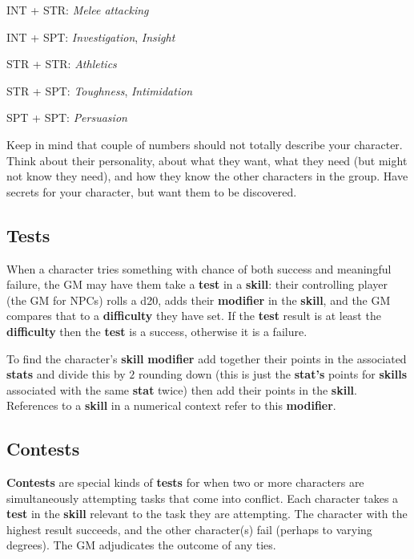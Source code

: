 \documentclass[11pt]{article}
\begin{document}
\begin{multicols}{3}
\begin{multicols}{2}
    INT + STR: ​\textit{Melee attacking}

    INT + SPT: \textit{Investigation}, \textit{Insight}

    STR + STR: \textit{​Athletics}

    STR + SPT: \textit{​Toughness}, \textit{Intimidation}

    SPT + SPT: ​\textit{Persuasion}
  \end{multicols}

  Keep in mind that couple of numbers should not totally describe your
  character. Think about their personality, about what they want, what they need
  (but might not know they need), and how they know the other characters in the
  group. Have secrets for your character, but want them to be discovered.

  \subsection*{Tests}

  When a character tries something with chance of both success and meaningful
  failure, the GM may have them take a \textbf{​test}​ in a \textbf{skill}: their
  controlling player (the GM for NPCs) rolls a d20, adds their \textbf{modifier}
  in the \textbf{skill}, and the GM compares that to a \textbf{difficulty} they
  have set. If the \textbf{test} result is at least the \textbf{difficulty} then
  the \textbf{test} is a success, otherwise it is a failure.

  To find the character's \textbf{skill} \textbf{modifier} add together their
  points in the associated \textbf{stats} and divide this by $2$ rounding down
  (this is just the \textbf{stat's} points for \textbf{skills} associated with
  the same \textbf{stat} twice) then add their points in the \textbf{skill}.
  References to a \textbf{skill} in a numerical context refer to this
  \textbf{modifier}.

  \subsection*{Contests}

  \textbf{Contests} are special kinds of \textbf{tests} for when two or more
  characters are simultaneously attempting tasks that come into conflict. Each
  character takes a \textbf{test} in the \textbf{skill} relevant to the task
  they are attempting. The character with the highest result succeeds, and the
  other character(s) fail (perhaps to varying degrees). The GM adjudicates the
  outcome of any ties.


\end{multicols}
\end{document}
